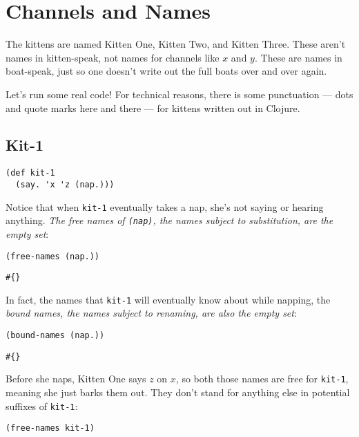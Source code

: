 \documentclass[10pt,oneside,x11names]{article}
\theoremstyle{definition}
\theoremstyle{warning}
\begin{document}
\section{Channels and Names}
\label{sec:orgdc4cf69}

The kittens are named Kitten One, Kitten Two, and Kitten
Three. These aren't names in kitten-speak, not names for
channels like \(x\) and \(y\). These are names in boat-speak, just
so one doesn't write out the full boats over and over again.

Let's run some real code! For technical reasons, there is some
punctuation --- dots and quote marks here and there --- for
kittens written out in Clojure.

\subsection{Kit-1}
\label{sec:org8a3b741}

\vskip 0.26cm
\begin{verbatim}
(def kit-1
  (say. 'x 'z (nap.)))
\end{verbatim}

Notice that when \texttt{kit-1} eventually takes a nap, she's not
saying or hearing anything. \emph{The free names of \texttt{(nap)}, the
names subject to substitution, are the empty set}:

\vskip 0.26cm
\begin{verbatim}
(free-names (nap.))
\end{verbatim}

\begin{verbatim}
#{}
\end{verbatim}


In fact, the names that \texttt{kit-1} will eventually know about while
napping, the \emph{bound names, the names subject to renaming, are also the
empty set}:

\vskip 0.26cm
\begin{verbatim}
(bound-names (nap.))
\end{verbatim}

\begin{verbatim}
#{}
\end{verbatim}


Before she naps, Kitten One says \(z\) on \(x\), so both those names
are free for \texttt{kit-1}, meaning she just barks them out. They don't
stand for anything else in potential suffixes of \texttt{kit-1}:

\vskip 0.26cm
\begin{verbatim}
(free-names kit-1)
\end{verbatim}
\end{document}
